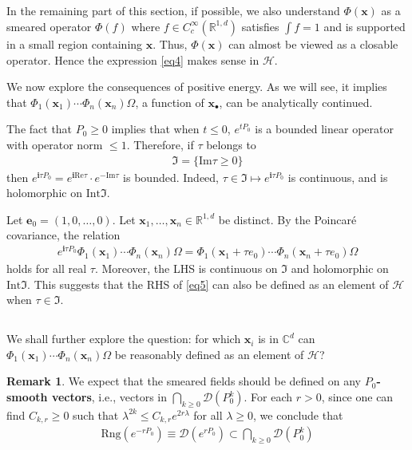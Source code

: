 \documentclass[12pt,b5paper,notitlepage]{article}
\theoremstyle{definition}
\newtheorem{rem}[df]{Remark}
\theoremstyle{plain}
\newcommand{\fk}{\mathfrak}
\newcommand{\mc}{\mathcal}
\newcommand{\Dom}{\scr{D}}
\newcommand{\scr}{\mathscr}
\newcommand{\im}{\mathbf{i}}
\newcommand{\mbf}{\mathbf}
\newcommand{\blt}{\bullet}
\newcommand{\Cbb}{\mathbb C}
\newcommand{\Rbb}{\mathbb R}
\newcommand{\Rng}{\mathrm{Rng}}
\newcommand{\Real}{\mathrm{Re}}
\newcommand{\Imag}{\mathrm{Im}}
\newcommand{\Int}{\mathrm{Int}}
\newcommand{\xbf}{\mathbf x}
\numberwithin{equation}{section}
\begin{document}
\subsection{}

In the remaining part of this section,  if possible, we also understand $\Phi(\xbf)$ as a smeared operator $\Phi(f)$ where $f\in C_c^\infty(\Rbb^{1,d})$ satisfies $\int f=1$ and is supported in a small region containing $\xbf$. Thus, $\Phi(\xbf)$ can almost be viewed as a closable operator. Hence the expression \eqref{eq4} makes sense in $\mc H$.


We now explore the consequences of positive energy. As we will see, it implies that $\Phi_1(\xbf_1)\cdots\Phi_n(\xbf_n)\Omega$, a function of $\xbf_\blt$, can be analytically continued.

The fact that $P_0\geq0$ implies that when $t\leq0$, $e^{tP_0}$ is a bounded linear operator with operator norm $\leq1$. Therefore, if $\tau$ belongs to
\begin{align*}
\fk I=\{\Imag\tau\geq0\}
\end{align*}
then $e^{\im \tau P_0}=e^{\im \Real\tau}\cdot e^{-\Imag\tau}$ is bounded. Indeed, $\tau\in\fk I\mapsto e^{\im\tau P_0}$ is continuous, and is holomorphic on $\Int\fk I$. 

Let $\mbf e_0=(1,0,\dots,0)$. Let $\xbf_1,\dots,\xbf_n\in\Rbb^{1,d}$ be distinct. By the Poincar\'e covariance, the relation
\begin{align}\label{eq5}
e^{\im\tau P_0}\Phi_1(\xbf_1)\cdots\Phi_n(\xbf_n)\Omega=\Phi_1(\xbf_1+\tau e_0)\cdots\Phi_n(\xbf_n+\tau e_0)\Omega
\end{align}
holds for all real $\tau$. Moreover, the LHS is continuous on $\fk I$ and holomorphic on $\Int\fk I$. This suggests that the RHS of \eqref{eq5} can also be defined as an element of $\mc H$ when $\tau\in\fk I$. 


\subsection{}\label{lb3}


We shall further explore the question: for which $\xbf_i$ is in $\Cbb^d$ can $\Phi_1(\xbf_1)\cdots\Phi_n(\xbf_n)\Omega$ be reasonably defined as an element of $\mc H$? 

\begin{rem}
We expect that the smeared fields should be defined on any \textbf{$P_0$-smooth vectors}, i.e., vectors in $\bigcap_{k\geq0}\Dom(P_0^k)$. For each $r>0$, since one can find $C_{k,r}\geq0$ such that $\lambda^{2k}\leq C_{k,r}e^{2r\lambda}$ for all $\lambda\geq0$, we conclude that
\begin{align}
\Rng(e^{-rP_0})\equiv \Dom(e^{rP_0})\subset \bigcap_{k\geq0}\Dom(P_0^k)
\end{align}
\end{rem}
\end{document}
